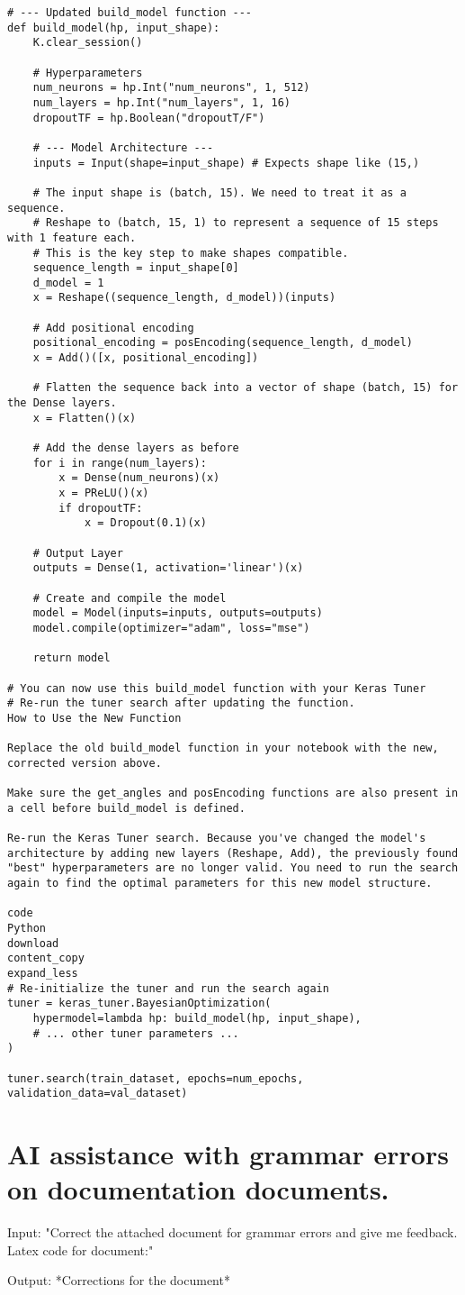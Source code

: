 \documentclass{article}
\begin{document}
\begin{verbatim}
# --- Updated build_model function ---
def build_model(hp, input_shape):
    K.clear_session()
    
    # Hyperparameters
    num_neurons = hp.Int("num_neurons", 1, 512)
    num_layers = hp.Int("num_layers", 1, 16)
    dropoutTF = hp.Boolean("dropoutT/F")

    # --- Model Architecture ---
    inputs = Input(shape=input_shape) # Expects shape like (15,)

    # The input shape is (batch, 15). We need to treat it as a sequence.
    # Reshape to (batch, 15, 1) to represent a sequence of 15 steps with 1 feature each.
    # This is the key step to make shapes compatible.
    sequence_length = input_shape[0]
    d_model = 1
    x = Reshape((sequence_length, d_model))(inputs)

    # Add positional encoding
    positional_encoding = posEncoding(sequence_length, d_model)
    x = Add()([x, positional_encoding])
    
    # Flatten the sequence back into a vector of shape (batch, 15) for the Dense layers.
    x = Flatten()(x)

    # Add the dense layers as before
    for i in range(num_layers):
        x = Dense(num_neurons)(x)
        x = PReLU()(x)
        if dropoutTF:
            x = Dropout(0.1)(x)

    # Output Layer
    outputs = Dense(1, activation='linear')(x)

    # Create and compile the model
    model = Model(inputs=inputs, outputs=outputs)
    model.compile(optimizer="adam", loss="mse")

    return model

# You can now use this build_model function with your Keras Tuner
# Re-run the tuner search after updating the function.
How to Use the New Function

Replace the old build_model function in your notebook with the new, corrected version above.

Make sure the get_angles and posEncoding functions are also present in a cell before build_model is defined.

Re-run the Keras Tuner search. Because you've changed the model's architecture by adding new layers (Reshape, Add), the previously found "best" hyperparameters are no longer valid. You need to run the search again to find the optimal parameters for this new model structure.

code
Python
download
content_copy
expand_less
# Re-initialize the tuner and run the search again
tuner = keras_tuner.BayesianOptimization(
    hypermodel=lambda hp: build_model(hp, input_shape),
    # ... other tuner parameters ...
)

tuner.search(train_dataset, epochs=num_epochs, validation_data=val_dataset)
\end{verbatim}


\section{AI assistance with grammar errors on documentation documents.}
Input: "Correct the attached document for grammar errors and give me feedback.
Latex code for document:"

Output: *Corrections for the document*
\end{document}
